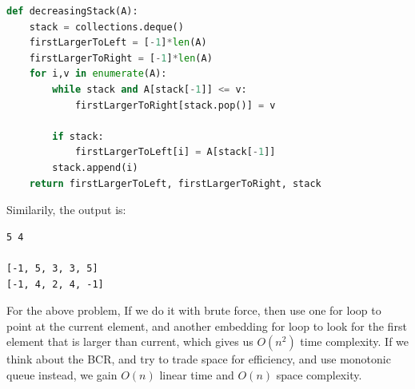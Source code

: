 \documentclass[../main.tex]{subfiles}
\begin{document}
\begin{lstlisting}[language=Python]
def decreasingStack(A):
    stack = collections.deque()
    firstLargerToLeft = [-1]*len(A)
    firstLargerToRight = [-1]*len(A)
    for i,v in enumerate(A):
        while stack and A[stack[-1]] <= v:
            firstLargerToRight[stack.pop()] = v
            
        if stack:
            firstLargerToLeft[i] = A[stack[-1]]
        stack.append(i)
    return firstLargerToLeft, firstLargerToRight, stack
\end{lstlisting}
Similarily, the output is:
\begin{lstlisting}
5 4 

[-1, 5, 3, 3, 5]
[-1, 4, 2, 4, -1]
\end{lstlisting}
For the above problem, If we do it with brute force, then use one for loop to point at the current element, and another embedding for loop to look for the first element that is larger than current, which gives us $O(n^2)$ time complexity. If we think about the BCR, and try to trade space for efficiency, and use monotonic queue instead, we gain $O(n)$ linear time and $O(n)$ space complexity.  
\end{document}
